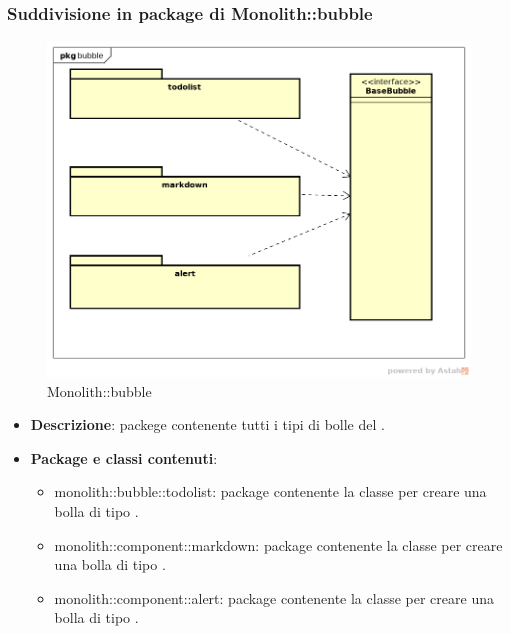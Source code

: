 \subsubsection{Suddivisione in package  di Monolith::bubble}
\label{Monolith::bubble}
\begin{figure}[H]
	\centering
	\includegraphics[scale=0.5]{Sezioni/imgPackage/bubble.png}
	\caption{Monolith::bubble}
\end{figure}
\begin{itemize}
	\item{\textbf{Descrizione}}: packege contenente tutti i tipi di bolle del .
	\item{\textbf{Package e classi contenuti}}:
	\begin{itemize}
	\item{monolith::bubble::todolist}: package contenente la classe per creare una bolla di tipo .
	\item{monolith::component::markdown}: package contenente la classe per creare una bolla di tipo .
	\item{monolith::component::alert}: package contenente la classe per creare una bolla di tipo .
	
	\end{itemize}
	
\end{itemize}

